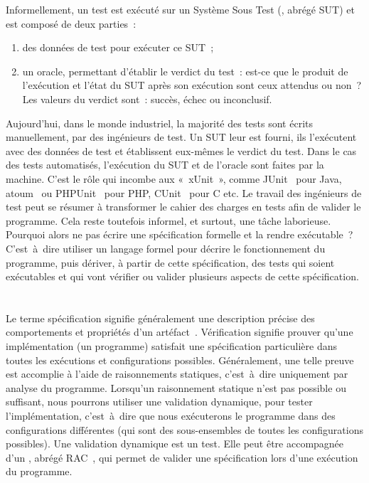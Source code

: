 Informellement, un test est exécuté sur un Système Sous Test (, abrégé {\strong SUT}) et est composé de deux parties~:
%
\begin{enumerate}

\item des {\strong données de test} pour exécuter ce SUT~;

\item un {\strong oracle}, permettant d'établir le verdict du test~: est-ce que
le produit de l'exécution et l'état du SUT après son exécution sont ceux
attendus ou non~? Les valeurs du verdict sont~: succès, échec ou inconclusif.

\end{enumerate}

Aujourd'hui, dans le monde industriel, la majorité des tests sont écrits
{\strong manuellement}, par des ingénieurs de test. Un SUT leur est fourni, ils
l'exécutent avec des données de test et établissent eux-mêmes le verdict du
test. Dans le cas des tests {\strong automatisés}, l'exécution du SUT et de
l'oracle sont faites par la machine. C'est le rôle qui incombe aux
 «~xUnit~», comme JUnit~ pour Java,
atoum~ ou PHPUnit~ pour PHP, CUnit~
pour C etc. Le travail des ingénieurs de test peut se résumer à transformer le
cahier des charges en tests afin de valider le programme. Cela reste toutefois
informel, et surtout, une tâche laborieuse. Pourquoi alors ne pas écrire une
spécification formelle et la rendre exécutable~? C'est~à~dire utiliser un
langage formel pour décrire le fonctionnement du programme, puis dériver, à
partir de cette spécification, des tests qui soient exécutables et qui vont
vérifier ou valider plusieurs aspects de cette spécification.

\section{}

Le terme {\strong spécification} signifie généralement une description précise
des comportements et propriétés d'un artéfact~. {\strong
Vérification} signifie prouver qu'une implémentation (un programme) satisfait
une spécification particulière dans toutes les exécutions et configurations
possibles.  Généralement, une telle preuve est accomplie à l'aide de
raisonnements statiques, c'est~à~dire uniquement par analyse du programme.
Lorsqu'un raisonnement statique n'est pas possible ou suffisant, nous pourrons
utiliser une {\strong validation} dynamique, pour tester l'implémentation,
c'est~à~dire que nous exécuterons le programme dans des configurations
différentes (qui sont des sous-ensembles de toutes les configurations
possibles). Une validation dynamique est un test. Elle peut être accompagnée
d'un , abrégé RAC~, qui
permet de valider une spécification lors d'une exécution du programme.

